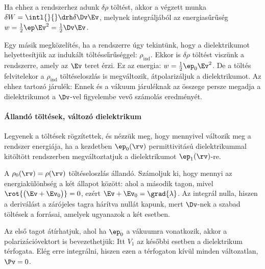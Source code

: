     Ha ehhez a rendszerhez adunk $\delta\rho$ töltést, akkor a végzett munka $\delta W=\intl{}{}\drh\delta\Dv\Ev$, melynek integráljából az energiasűrűség $w=\frac{1}{2}\ep\Ev^2=\frac 12\Dv\Ev$.
    
    Egy másik megközelítés, ha a rendszerre úgy tekintünk, hogy a dielektrikumot helyettesítjük az indukált töltéssűrűséggel: $\rho_\text{ind}$.
   Ekkor is $\delta\rho$ töltést viszünk a rendszerre, amely az $\Ev$ teret érzi.
   Ez az energia: $w=\frac{1}{2}\ep_0\Ev^2$.
   De a töltés felvitelekor a $\rho_\text{ind}$ töltéseloszlás is megváltozik, átpolarizáljuk a dielektrikumot.
   Az ehhez tartozó járulék: 
    Ennek és a vákuum járuléknak az összege persze megadja a dielektrikumot a $\Dv$-vel figyelembe vevő számolás eredményét.
    
   \paragraph{Állandó töltések, változó dielektrikum}
    
    Legyenek a töltések rögzítettek, és nézzük meg, hogy mennyivel változik meg a rendszer energiája, ha a kezdetben $\ep_0(\rv)$ permittivitású dielektrikummal kitöltött rendszerben megváltoztatjuk a dielektrikumot $\ep_1(\rv)$-re. 
    
    A $\rho_0(\rv)=\rho(\rv)$ töltéseloszlás állandó.
   Számoljuk ki, hogy mennyi az energiakülönbség a két állapot között:
    ahol a második tagon, mivel $\rot{\big(\Ev+\Ev_0\big)}=0$, ezért $\Ev+\Ev_0=\grad{\lambda}$.
   Az integrál nulla, hiszen a deriválást a zárójeles tagra hárítva nullát kapunk, mert $\Dv$-nek a szabad töltések a forrásai, amelyek ugyanazok a két esetben. 
    
    Az első tagot átírhatjuk, ahol ha $\ep_0$ a vákuumra vonatkozik, akkor a polarizációvektort is bevezethetjük:
    Itt $V_1$ az későbbi esetben a dielektrikum térfogata.
   Elég erre integrálni, hiszen ezen a térfogaton kívül minden változatlan, $\Pv=0$. 
    
